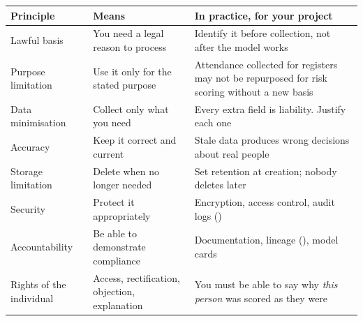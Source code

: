 \begin{longtable}{@{}L{3.2cm}L{4.8cm}L{6.2cm}@{}}
\toprule
{}
\textbf{Principle} & \textbf{Means} & \textbf{In practice, for your project} \\
\midrule
\endhead
Lawful basis & You need a legal reason to process & Identify it before collection, not after the model works \\
Purpose limitation & Use it only for the stated purpose & Attendance collected for registers may not be repurposed for risk scoring without a new basis \\
Data minimisation & Collect only what you need & Every extra field is liability. Justify each one \\
Accuracy & Keep it correct and current & Stale data produces wrong decisions about real people \\
Storage limitation & Delete when no longer needed & Set retention at creation; nobody deletes later \\
Security & Protect it appropriately & Encryption, access control, audit logs () \\
Accountability & Be able to demonstrate compliance & Documentation, lineage (), model cards \\
Rights of the individual & Access, rectification, objection, explanation & You must be able to say why \emph{this person} was scored as they were \\
\bottomrule
\end{longtable}

